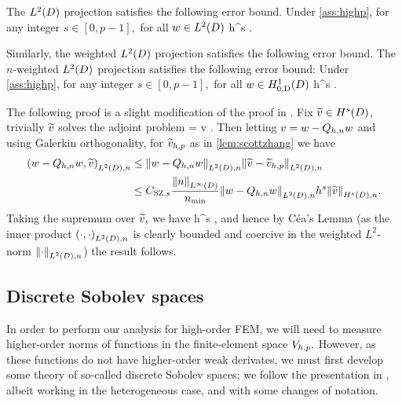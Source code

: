 The $\LtD$ projection satisfies the following error bound.
\label{lem:ltdprojerr}
Under \cref{ass:highp}, for any integer $s \in [0,p-1],$ for all $w \in \LtD$
\beqs
{} \leq \Cmsz h^{s} .
\eeqs
\ele

Similarly, the weighted $\LtD$ projection satisfies the following error bound.
The $n$-weighted $\LtD$ projection satisfies the following error bound:
\label{lem:wltdprojerr}
Under \cref{ass:highp}, for any integer $s \in [0,p-1],$ for all $w \in \HozDD$
\beq\label{eq:wltdprojerr}
 \leq {}  h^{s} .
\eeq
\ele

The following proof is a slight modification of the proof in \cite[Theorem 5.8.3]{BrSc:08}. Fix $\vtilde \in \HsD$, trivially $\widetilde{v}$ solves the adjoint problem
\beqs
{} =  \tforall v \in \LtD.
\eeqs
Then letting $v=w-Q_{h,n} w$ and using Galerkin orthogonality, for $\widetilde{v}_{h,p}$ as in \cref{lem:scottzhang} we have
\begin{align*}
\IPLtDn{w-\Qhn w}{\vtilde} &\leq \NLtDn{w-\Qhn w}\NLtDn{\vtilde-\vhptilde}\\
&\leq \CSZfn{s} \frac{\NLiD{n}}{\nmin}\NLtDn{w-\Qhn w} h^s \NHsDn{\vtilde}.
\end{align*}
Taking the supremum over $\widetilde{v},$ we have
\beqs
{} \leq {}  h^s ,
\eeqs
and hence by C\'ea's Lemma (as the inner product $\IPLtDn{\cdot}{\cdot}$ is clearly bounded and coercive in the weighted $L^2$-norm $\NLtDn{\cdot}$) the result follows.
\epf

\subsection{Discrete Sobolev spaces}\label{sec:discsob}
In order to perform our analysis for high-order FEM, we will need to measure higher-order norms of functions in the finite-element space $V_{h,p}.$ However, as these functions do not have higher-order weak derivates, we must first develop some theory of so-called discrete Sobolev spaces; we follow the presentation in \cite{DuWu:15}, albeit working in the heterogeneous case, and with some changes of notation.

